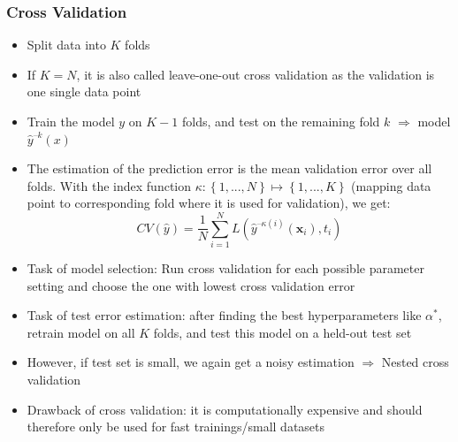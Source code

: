 \subsubsection{Cross Validation}
\begin{itemize}
	\item Split data into $K$ folds %
	\item If $K=N$, it is also called leave-one-out cross validation as the validation is one single data point
	\item Train the model $y$ on $K-1$ folds, and test on the remaining fold $k$ $\Rightarrow$ model $\hat{y}^{\mbox{--}k}(x)$
	\item The estimation of the prediction error is the mean validation error over all folds. With the index function $\kappa:\left\{1,...,N\right\}\mapsto\left\{1,...,K\right\}$ (mapping data point to corresponding fold where it is used for validation), we get:
	$$CV(\hat{y}) = \frac{1}{N}\sum\limits_{i=1}^{N}L\left(\hat{y}^{\mbox{--}\kappa\left(i\right)}(\bm{x}_i), t_i\right)$$
	\item Task of model selection: Run cross validation for each possible parameter setting and choose the one with lowest cross validation error
	\item Task of test error estimation: after finding the best hyperparameters like $\alpha^*$, retrain model on all $K$ folds, and test this model on a held-out test set
	\item However, if test set is small, we again get a noisy estimation $\Rightarrow$ Nested cross validation
	\item Drawback of cross validation: it is computationally expensive and should therefore only be used for fast trainings/small datasets
\end{itemize}
